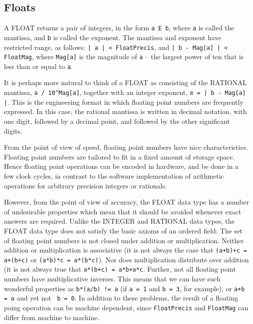 \subsection{Floats}

A FLOAT returns a pair of integers, in the form \verb+a E b+, where
\verb+a+ is called the mantissa, and \verb+b+ is called the exponent.
The mantissa and exponent have restricted range, as follows:  
\verb+| a | < FloatPrecis+, and \verb+| b - Mag[a] | < FloatMag+, where
\verb+Mag[a]+ is the magnitude of \verb+a+ -- the largest power of ten 
that is less than or equal to \verb+a+.  

It is perhaps more natural to think of a FLOAT as consisting of the
RATIONAL mantissa, \verb+a / 10^Mag[a]+, together with an integer
exponent, \verb+e = | b - Mag[a] |+.  This is the engineering format
in which floating point numbers are frequently expressed.  In this
case, the rational mantissa is written in decimal notation, with one
digit, followed by a decimal point, and followed by the other
significant digits.

From the point of view of speed, floating point numbers have nice
characteristics.  Floating point numbers are tailored to fit in a
fixed amount of storage space.  Hence floating point operations can be
encoded in hardware, and be done in a few clock cycles, in contrast to
the software implementation of arithmetic operations for arbitrary
precision integers or rationals.  

However, from the point of view of accuracy, the FLOAT data type has a
number of undesirable properties which mean that it should be avoided
whenever exact answers are required.  Unlike the INTEGER and RATIONAL
data types, the FLOAT data type does not satisfy the basic axioms of
an ordered field: The set of floating point numbers is not closed
under addition or multiplication.  Neither addition or multiplication
is associative (it is not always the case that
\verb&(a+b)+c = a+(b+c)& or 
\verb+(a*b)*c = a*(b*c)+).  Nor does multiplication
distribute over addition (it is not always true that 
\verb&a*(b+c) = a*b+a*c&.  Further, not all floating point numbers have
multiplicative inverses.  This means that we can have such wonderful
properties as \verb+b*(a/b) != a+ (if \verb+a = 1+ and
\verb+b = 3+, for example), or \verb&a+b = a& and yet not \verb+ b = 0+.  In
addition to these problems, the result of a floating poing operation
can be machine dependent, since \verb+FloatPrecis+ and 
\verb+FloatMag+ can differ from machine to machine.

